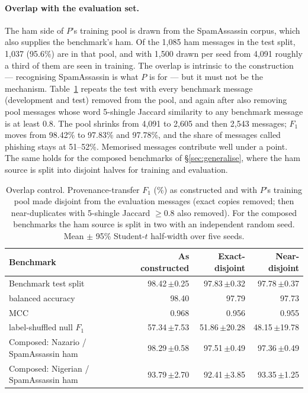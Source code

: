 \documentclass[twoside,11pt]{article}
\begin{document}
\paragraph{Overlap with the evaluation set.}
\label{sec:overlap}
The ham side of $P$'s training pool is drawn from the SpamAssassin corpus,
which also supplies the benchmark's ham. Of the 1{,}085 ham messages in the
test split, 1{,}037 (95.6\%) are in that pool, and with 1{,}500 drawn per seed
from 4{,}091 roughly a third of them are seen in training. The overlap is
intrinsic to the construction --- recognising SpamAssassin is what $P$ is for
--- but it must not be the mechanism. Table~\ref{tab:overlap} repeats the test
with every benchmark message (development and test) removed from the pool,
and again after also removing pool messages whose word 5-shingle Jaccard
similarity to any benchmark message is at least 0.8. The pool shrinks from
4{,}091 to 2{,}605 and then 2{,}543 messages; $F_1$ moves from 98.42\% to
97.83\% and 97.78\%, and the share of messages called phishing stays at
51--52\%. Memorised messages contribute well under a point. The same holds for
the composed benchmarks of \S\ref{sec:generalise}, where the ham source is
split into disjoint halves for training and evaluation.

\begin{table}[t]
\centering\small
\caption{Overlap control. Provenance-transfer $F_1$ (\%) as constructed and
with $P$'s training pool made disjoint from the evaluation messages (exact
copies removed; then near-duplicates with 5-shingle Jaccard $\geq 0.8$ also
removed). For the composed benchmarks the ham source is split in two with an
independent random seed. Mean $\pm$ 95\% Student-$t$ half-width over five
seeds.}
\label{tab:overlap}
\begin{tabular}{lrrr}
\toprule
Benchmark & As constructed & Exact-disjoint & Near-disjoint \\
\midrule
Benchmark test split & 98.42\,$\pm$0.25 & 97.83\,$\pm$0.32 & 97.78\,$\pm$0.37 \\
\quad balanced accuracy & 98.40 & 97.79 & 97.73 \\
\quad MCC & 0.968 & 0.956 & 0.955 \\
\quad label-shuffled null $F_1$ & 57.34\,$\pm$7.53 & 51.86\,$\pm$20.28 & 48.15\,$\pm$19.78 \\
\midrule
Composed: Nazario / SpamAssassin ham & 98.29\,$\pm$0.58 & 97.51\,$\pm$0.49 & 97.36\,$\pm$0.49 \\
Composed: Nigerian / SpamAssassin ham & 93.79\,$\pm$2.70 & 92.41\,$\pm$3.85 & 93.35\,$\pm$1.25 \\
\bottomrule
\end{tabular}
\end{table}
\end{document}
